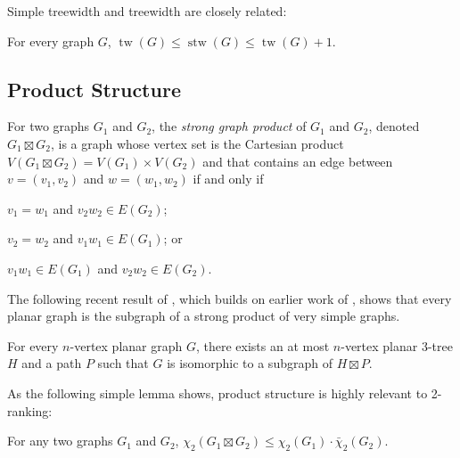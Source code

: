 \documentclass[kpfonts]{patmorin}
\DeclareMathOperator{\tw}{tw}
\DeclareMathOperator{\stw}{stw}
\newcommand{\trn}{\chi_2}
\newcommand{\dtcn}{\bar{\chi}_2}
\theoremstyle{named}
\begin{document}
Simple treewidth and treewidth are closely related:

\begin{clm}\label{simple-treewidth-vs-treewidth}
    For every graph $G$, $\tw(G)\le \stw(G)\le \tw(G)+1$.
\end{clm}

\subsection{Product Structure}

For two graphs $G_1$ and $G_2$, the \emph{strong graph product} of $G_1$ and $G_2$, denoted $G_1\boxtimes G_2$, is a graph whose vertex set is the Cartesian product $V(G_1\boxtimes G_2)= V(G_1)\times V(G_2)$ and that contains an edge between $v=(v_1,v_2)$ and $w=(w_1,w_2)$ if and only if
\begin{inparaenum}[(i)]
    \item $v_1=w_1$ and $v_2w_2\in E(G_2)$;
    \item $v_2=w_2$ and $v_1w_1\in E(G_1)$; or
    \item $v_1w_1\in E(G_1)$ and $v_2w_2\in E(G_2)$.
\end{inparaenum}

The following recent result of \citet{dujmovic.joret.ea:planar}, which builds on earlier work of \citet{pilipczuk.siebertz:polynomial}, shows that every planar graph is the subgraph of a strong product of very simple graphs.

\begin{thm}\cite{dujmovic.joret.ea:planar}\label{product-structure}
    For every $n$-vertex planar graph $G$, there exists an at most $n$-vertex planar 3-tree $H$ and a path $P$ such that $G$ is isomorphic to a subgraph of $H\boxtimes P$.
\end{thm}

As the following simple lemma shows, product structure is highly relevant to 2-ranking:

\begin{lem}\label{product-lemma}
    For any two graphs $G_1$ and $G_2$, $\trn(G_1\boxtimes G_2)\le \trn(G_1)\cdot\dtcn(G_2)$.
\end{lem}
\end{document}

